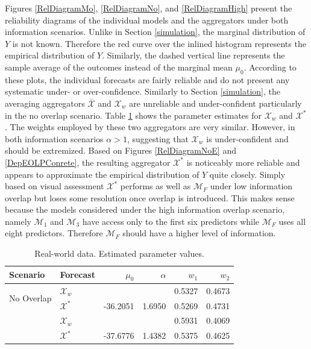 \documentclass[11pt]{article}
\theoremstyle{definition}
\theoremstyle{definition}
\begin{document}
Figures \ref{RelDiagramMo}, \ref{RelDiagramNo}, and \ref{RelDiagramHigh} present the reliability diagrams of the individual models and the aggregators under both information scenarios. Unlike in Section \ref{simulation}, the marginal distribution of $Y$ is not known. Therefore the red curve over the inlined histogram represents the empirical distribution of $Y$. Similarly, the dashed vertical line represents the sample average of the outcomes instead of the marginal mean $\mu_0$. According to these plots, the individual forecasts are fairly reliable and do not present any systematic under- or over-confidence. Similarly to Section \ref{simulation}, the averaging aggregators $\bar{\mathcal{X}}$ and $\mathcal{X}_w$ are  unreliable and under-confident particularly in the no overlap scenario. Table \ref{NoParamsReal} shows the parameter estimates for $\mathcal{X}_w$ and $\mathcal{X}^*$. The weights employed by these two aggregators are very similar. However, in both information scenarios $\alpha > 1$, suggesting that $\mathcal{X}_w$ is under-confident and should be extremized. Based on Figures \ref{RelDiagramNoE} and  \ref{DepEOLPConrete}, the resulting aggregator $\mathcal{X}^*$ is noticeably more reliable and appears to approximate the empirical distribution of $Y$ quite closely. Simply based on visual assessment $\mathcal{X}^*$ performs as well as $\mathcal{M}_F$ under low information overlap but  loses some resolution once  overlap is introduced. This makes sense because the models considered under the high information overlap scenario, namely $\mathcal{M}_1$ and $\mathcal{M}_3$ have access only to the first six predictors while $\mathcal{M}_F$ uses all eight predictors. Therefore $\mathcal{M}_F$ should have a higher level of information. 

\begin{table}[ht]
\centering
\caption{Real-world data. Estimated parameter values.} 
\begin{tabular}{llrrrr}
   \hline \hline
Scenario & Forecast & $\mu_0$ & $\alpha$ & $w_1$ & $w_2$\\
  \hline
\multirow{2}{*}{No Overlap} & $\mathcal{X}_w$ &  &  & 0.5327 & 0.4673 \\ 
&  $\mathcal{X}^*$ & -36.2051 & 1.6950 & 0.5269 & 0.4731 \\  \rule{0pt}{2.9ex} 
\hspace{-0.2em}\multirow{2}{*}{High Overlap}  & $\mathcal{X}_w$ &  &  & 0.5931 & 0.4069 \\ 
 & $\mathcal{X}^*$ & -37.6776 & 1.4382 & 0.5375 & 0.4625 \\ 
   \hline
\end{tabular}
\label{NoParamsReal}
\end{table}
\end{document}
